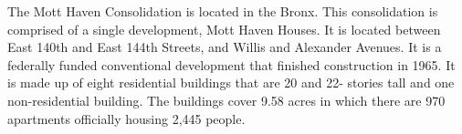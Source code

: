      

   

The Mott Haven Consolidation is located in the Bronx. This consolidation is comprised of a single development, Mott Haven Houses. It is located between East 140th and East 144th Streets, and Willis and Alexander Avenues. It is a federally funded conventional development that finished construction in 1965. It is made up of eight residential buildings that are 20 and 22- stories tall and one non-residential building. The buildings cover 9.58 acres in which there are 970 apartments officially housing 2,445 people. 
